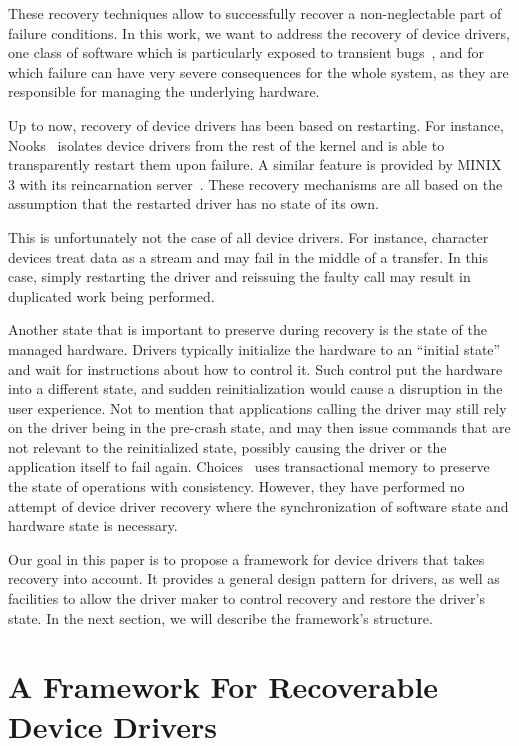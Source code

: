 \documentclass[times, 10pt, twocolumn]{article}
\begin{document}
These recovery techniques allow to successfully recover a non-neglectable part of failure conditions. In this work, we want to address the recovery of device drivers, one class of software which is particularly exposed to transient bugs~\cite{Chou2001}, and for which failure can have very severe consequences for the whole system, as they are responsible for managing the underlying hardware.

Up to now, recovery of device drivers has been based on restarting. For instance, Nooks~\cite{Swift2003,Swift2006} isolates device drivers from the rest of the kernel and is able to transparently restart them upon failure. A similar feature is provided by MINIX 3 with its reincarnation server~\cite{Herder2007}. These recovery mechanisms are all based on the assumption that the restarted driver has no state of its own.

This is unfortunately not the case of all device drivers. For instance, character devices treat data as a stream and may fail in the middle of a transfer. In this case, simply restarting the driver and reissuing the faulty call may result in duplicated work being performed.

Another state that is important to preserve during recovery is the state of the managed hardware. Drivers typically initialize the hardware to an ``initial state'' and wait for instructions about how to control it. Such control put the hardware into a different state, and sudden reinitialization would cause a disruption in the user experience. Not to mention that applications calling the driver may still rely on the driver being in the pre-crash state, and may then issue commands that are not relevant to the reinitialized state, possibly causing the driver or the application itself to fail again.  Choices~\cite{David2007} uses transactional memory to preserve the state of operations with consistency.  However, they have performed no attempt of device driver recovery where the synchronization of software state and hardware state is necessary.

Our goal in this paper is to propose a framework for device drivers that takes recovery into account. It provides a general design pattern for drivers, as well as facilities to allow the driver maker to control recovery and restore the driver's state. In the next section, we will describe the framework's structure.

\section{A Framework For Recoverable Device Drivers}
\label{s:design}
\end{document}

